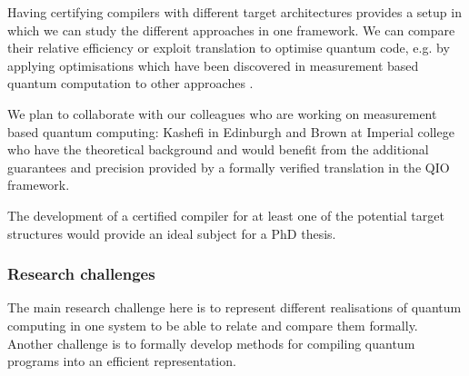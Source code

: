 \documentclass[a4paper]{article}
\begin{document}
Having certifying compilers with different target architectures
provides a setup in which we can study the different approaches in one
framework. We can compare their relative efficiency or exploit
translation to optimise quantum code, e.g. by applying optimisations
which have been discovered in measurement based quantum computation to
other approaches .

We plan to collaborate with our colleagues who are working on
measurement based quantum computing: Kashefi in Edinburgh and
Brown at Imperial college who have the theoretical background and
would benefit from the additional guarantees and precision provided
by a formally verified translation in the QIO framework.

The development of a certified compiler for at least one of the
potential target structures would provide an ideal subject for a PhD
thesis. 



\subsubsection*{Research challenges}

The main research challenge here is to represent different realisations
of quantum computing in one system to be able to relate and compare
them formally. Another challenge is to formally develop methods
for compiling quantum programs into an efficient representation.
\end{document}

